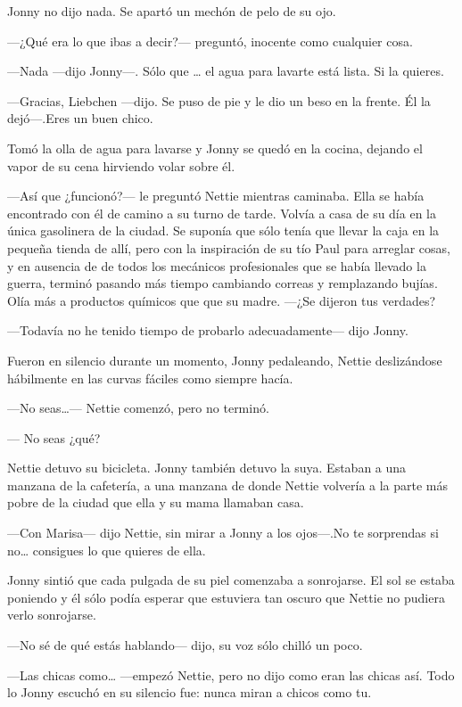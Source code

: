 Jonny no dijo nada. Se apartó un mechón de pelo de su ojo.

---¿Qué era lo que ibas a decir?--- preguntó, inocente como cualquier
cosa.

---Nada ---dijo Jonny---. Sólo que \ldots{} el agua para lavarte está
lista. Si la quieres.

---Gracias, Liebchen ---dijo. Se puso de pie y le dio un beso en la
frente. Él la dejó---.Eres un buen chico.

Tomó la olla de agua para lavarse y Jonny se quedó en la cocina, dejando
el vapor de su cena hirviendo volar sobre él.

---Así que ¿funcionó?--- le preguntó Nettie mientras caminaba. Ella se
había encontrado con él de camino a su turno de tarde. Volvía a casa de
su día en la única gasolinera de la ciudad. Se suponía que sólo tenía
que llevar la caja en la pequeña tienda de allí, pero con la inspiración
de su tío Paul para arreglar cosas, y en ausencia de de todos los
mecánicos profesionales que se había llevado la guerra, terminó pasando
más tiempo cambiando correas y remplazando bujías. Olía más a productos
químicos que que su madre. ---¿Se dijeron tus verdades?

---Todavía no he tenido tiempo de probarlo adecuadamente--- dijo Jonny.

Fueron en silencio durante un momento, Jonny pedaleando, Nettie
deslizándose hábilmente en las curvas fáciles como siempre hacía.

---No seas\ldots{}--- Nettie comenzó, pero no terminó.

--- No seas ¿qué?

Nettie detuvo su bicicleta. Jonny también detuvo la suya. Estaban a una
manzana de la cafetería, a una manzana de donde Nettie volvería a la
parte más pobre de la ciudad que ella y su mama llamaban casa.

---Con Marisa--- dijo Nettie, sin mirar a Jonny a los ojos---.No te
sorprendas si no\ldots{} consigues lo que quieres de ella.

Jonny sintió que cada pulgada de su piel comenzaba a sonrojarse. El sol
se estaba poniendo y él sólo podía esperar que estuviera tan oscuro que
Nettie no pudiera verlo sonrojarse.

---No sé de qué estás hablando--- dijo, su voz sólo chilló un poco.

---Las chicas como\ldots{} ---empezó Nettie, pero no dijo como eran las
chicas así. Todo lo Jonny escuchó en su silencio fue: nunca miran a
chicos como tu.

